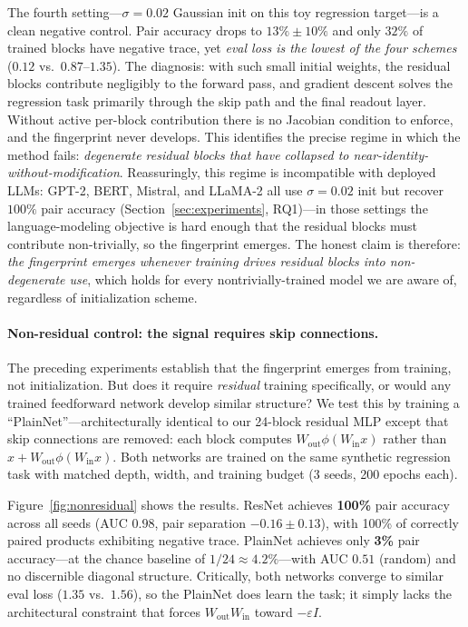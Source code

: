 \documentclass[wcp]{jmlr}
\begin{document}
The fourth setting---$\sigma{=}0.02$ Gaussian init on this toy regression target---is a clean negative control. Pair accuracy drops to $13\%\pm 10\%$ and only $32\%$ of trained blocks have negative trace, yet \emph{eval loss is the lowest of the four schemes} ($0.12$ vs.\ $0.87$--$1.35$). The diagnosis: with such small initial weights, the residual blocks contribute negligibly to the forward pass, and gradient descent solves the regression task primarily through the skip path and the final readout layer. Without active per-block contribution there is no Jacobian condition to enforce, and the fingerprint never develops. This identifies the precise regime in which the method fails: \emph{degenerate residual blocks that have collapsed to near-identity-without-modification}. Reassuringly, this regime is incompatible with deployed LLMs: GPT-2, BERT, Mistral, and LLaMA-2 all use $\sigma{=}0.02$ init but recover $100\%$ pair accuracy (Section~\ref{sec:experiments}, RQ1)---in those settings the language-modeling objective is hard enough that the residual blocks must contribute non-trivially, so the fingerprint emerges. The honest claim is therefore: \emph{the fingerprint emerges whenever training drives residual blocks into non-degenerate use}, which holds for every nontrivially-trained model we are aware of, regardless of initialization scheme.

\paragraph{Non-residual control: the signal requires skip connections.}
The preceding experiments establish that the fingerprint emerges from training, not initialization. But does it require \emph{residual} training specifically, or would any trained feedforward network develop similar structure? We test this by training a ``PlainNet''---architecturally identical to our 24-block residual MLP except that skip connections are removed: each block computes $W_{\mathrm{out}} \phi(W_{\mathrm{in}} x)$ rather than $x + W_{\mathrm{out}} \phi(W_{\mathrm{in}} x)$. Both networks are trained on the same synthetic regression task with matched depth, width, and training budget (3 seeds, 200 epochs each).

Figure~\ref{fig:nonresidual} shows the results. ResNet achieves \textbf{100\%} pair accuracy across all seeds (AUC $0.98$, pair separation $-0.16 \pm 0.13$), with 100\% of correctly paired products exhibiting negative trace. PlainNet achieves only \textbf{3\%} pair accuracy---at the chance baseline of $1/24 \approx 4.2\%$---with AUC $0.51$ (random) and no discernible diagonal structure. Critically, both networks converge to similar eval loss ($1.35$ vs.\ $1.56$), so the PlainNet does learn the task; it simply lacks the architectural constraint that forces $W_{\mathrm{out}} W_{\mathrm{in}}$ toward $-\varepsilon I$.
\end{document}
